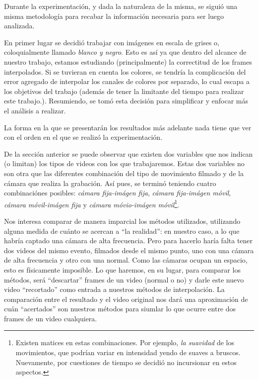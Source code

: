 Durante la experimentaci\'on, y dada la naturaleza de la misma,
se sigui\'o una misma metodolog\'ia para recabar la informaci\'on necesaria para
ser luego analizada.

\par En primer lugar se decidi\'o trabajar con im\'agenes en escala de grises o,
coloquialmente llamado \emph{blanco y negro}. Esto es as\'i ya que dentro del
alcance de nuestro trabajo, estamos estudiando (principalmente) la correctitud
de los frames interpolados. Si se tuvieran en cuenta los colores, se tendr\'ia
la complicaci\'on del error agregado de interpolar los canales de colores por
separado, lo cual escapa a los objetivos del trabajo (adem\'as de tener la
limitante del tiempo para realizar este trabajo.). Resumiendo, se tom\'o esta
decisi\'on para simplificar y enfocar m\'as el an\'alisis a realizar.

\par La forma en la que se presentar\'an los resultados m\'as adelante nada
tiene que ver con el orden en el que se realiz\'o la experimentaci\'on.

\par De la secci\'on anterior se puede observar que existen dos variables que
nos indican (o limitan) los tipos de videos con los que trabajaremos. Estas dos
variables no son otra que las diferentes combinaci\'on del tipo de movimiento
filmado y de la c\'amara que realiza la grabaci\'on. As\'i pues, se termin\'o
teniendo cuatro combinaci\'ones posibles: \emph{c\'amara fija-im\'agen fija},
\emph{c\'amara fija-im\'agen m\'ovil}, \emph{c\'amara m\'ovil-im\'agen fija} y
\emph{c\'amara m\'ovio-im\'agen m\'ovil}\footnote{Existen matices en estas
combinaciones. Por ejemplo, \emph{la suavidad} de los movimientos, que podr\'ian
variar en intensidad yendo de suaves a bruscos. Nuevamente, por cuestiones de
tiempo se decidi\'o no incursionar en estos aspectos.}.

\par Nos interesa comparar de manera imparcial los métodos utilizados,
utilizando alguna medida de cuánto se acercan a ``la realidad'': en nuestro
caso, a lo que habría captado una cámara de alta frecuencia. Pero para hacerlo
haría falta tener dos videos del mismo evento, filmados desde el mismo punto,
uno con una cámara de alta frecuencia y otro con una normal. Como las cámaras
ocupan un espacio, esto es físicamente imposible\cite{wiki_impenetrability}. Lo
que haremos, en su lugar, para comparar los métodos, será ``descartar'' frames
de un video (normal o no) y darle este nuevo video ``recortado'' como entrada a
nuestros métodos de interpolación. La comparación entre el resultado y el video
original nos dará una aproximación de cuán ``acertados'' son nuestros métodos
para siumlar lo que ocurre entre dos frames de un video cualquiera.

